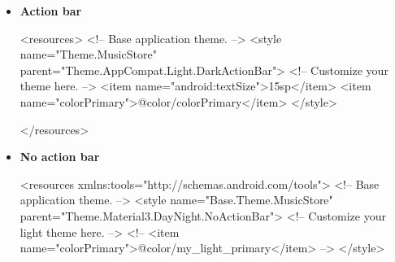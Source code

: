 \documentclass{report}
\begin{document}
\begin{itemize}
        \item \textbf{Action bar}
            \bigbreak \noindent 
            \begin{javacode}
                <resources>
                  <!-- Base application theme. -->
                  <style name="Theme.MusicStore" parent="Theme.AppCompat.Light.DarkActionBar">
                    <!-- Customize your theme here. -->
                    <item name="android:textSize">15sp</item>
                    <item name="colorPrimary">@color/colorPrimary</item>
                  </style>
                  
                </resources> 
            \end{javacode}
        \item \textbf{No action bar}
            \bigbreak \noindent 
            \begin{javacode}
                <resources xmlns:tools="http://schemas.android.com/tools">
                    <!-- Base application theme. -->
                    <style name="Base.Theme.MusicStore" parent="Theme.Material3.DayNight.NoActionBar">
                        <!-- Customize your light theme here. -->
                        <!-- <item name="colorPrimary">@color/my_light_primary</item> -->
                    </style>


\end{javacode}
\end{itemize}
\end{document}
